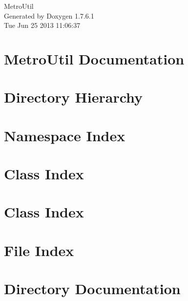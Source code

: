 \documentclass[a4paper]{book}
\begin{document}
\hypersetup{pageanchor=false,citecolor=blue}
\begin{titlepage}
\vspace*{7cm}
\begin{center}
{\Large \-Metro\-Util }\\
\vspace*{1cm}
{\large \-Generated by Doxygen 1.7.6.1}\\
\vspace*{0.5cm}
{\small Tue Jun 25 2013 11:06:37}\\
\end{center}
\end{titlepage}
\clearemptydoublepage
{}
\tableofcontents
\clearemptydoublepage
{}
\hypersetup{pageanchor=true,citecolor=blue}
\chapter{\-Metro\-Util \-Documentation}
\label{index}\hypertarget{index}{}
\chapter{\-Directory \-Hierarchy}

\chapter{\-Namespace \-Index}

\chapter{\-Class \-Index}

\chapter{\-Class \-Index}

\chapter{\-File \-Index}

\chapter{\-Directory \-Documentation}








\end{document}
